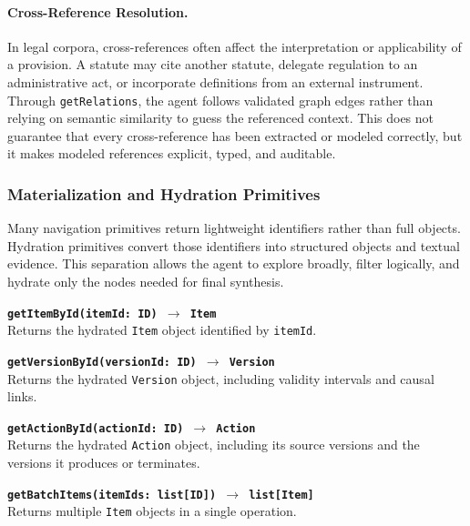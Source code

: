 \documentclass[11pt]{article}
\begin{document}
\paragraph{Cross-Reference Resolution.}
In legal corpora, cross-references often affect the interpretation or applicability of a provision. A statute may cite another statute, delegate regulation to an administrative act, or incorporate definitions from an external instrument. Through \texttt{getRelations}, the agent follows validated graph edges rather than relying on semantic similarity to guess the referenced context. This does not guarantee that every cross-reference has been extracted or modeled correctly, but it makes modeled references explicit, typed, and auditable.

\subsubsection{Materialization and Hydration Primitives}
\label{subsubsec:materialization_primitives}

Many navigation primitives return lightweight identifiers rather than full objects. Hydration primitives convert those identifiers into structured objects and textual evidence. This separation allows the agent to explore broadly, filter logically, and hydrate only the nodes needed for final synthesis.

\vspace{0.3cm}
\noindent\textbf{\texttt{getItemById(itemId: ID) $\rightarrow$ Item}}\\
Returns the hydrated \texttt{Item} object identified by \texttt{itemId}.

\vspace{0.3cm}
\noindent\textbf{\texttt{getVersionById(versionId: ID) $\rightarrow$ Version}}\\
Returns the hydrated \texttt{Version} object, including validity intervals and causal links.

\vspace{0.3cm}
\noindent\textbf{\texttt{getActionById(actionId: ID) $\rightarrow$ Action}}\\
Returns the hydrated \texttt{Action} object, including its source versions and the versions it produces or terminates.

\vspace{0.3cm}
\noindent\textbf{\texttt{getBatchItems(itemIds: list[ID]) $\rightarrow$ list[Item]}}\\
Returns multiple \texttt{Item} objects in a single operation.
\end{document}
